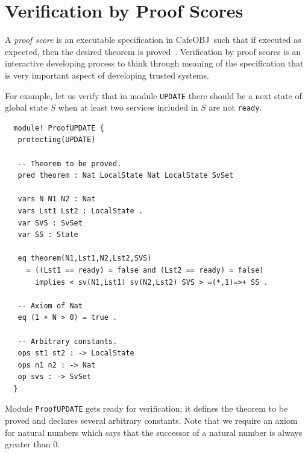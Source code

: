 \documentclass[12pt]{report}
\newcommand{\cafeobj}{{\sf CafeOBJ}~}
\begin{document}
\section{Verification by Proof Scores}
\label{sec:pscore}
A {\it proof score} is an executable specification in \cafeobj such
that if executed as expected, then the desired theorem is
proved~\cite{FutatsugiGO12pps}. Verification by proof scores is an
interactive developing process to think through meaning of the
specification that is very important aspect of developing trusted
systems.

For example, let us verify that in module {\tt UPDATE} there should be
a next state of global state $S$ when at least two services included in $S$
are not {\tt ready}.
\small
\begin{verbatim}
  module! ProofUPDATE {
   protecting(UPDATE)
  
   -- Theorem to be proved.
   pred theorem : Nat LocalState Nat LocalState SvSet
  
   vars N N1 N2 : Nat
   vars Lst1 Lst2 : LocalState .
   var SVS : SvSet
   var SS : State
  
   eq theorem(N1,Lst1,N2,Lst2,SVS)
     = ((Lst1 == ready) = false and (Lst2 == ready) = false)
       implies < sv(N1,Lst1) sv(N2,Lst2) SVS > =(*,1)=>+ SS .
  
   -- Axiom of Nat
   eq (1 + N > 0) = true .
  
   -- Arbitrary constants.
   ops st1 st2 : -> LocalState
   ops n1 n2 : -> Nat
   op svs : -> SvSet
  }
\end{verbatim}
\normalsize
Module {\tt ProofUPDATE} gets ready for verification; it defines the
theorem to be proved and declares several arbitrary constants.  Note
that we require an axiom for natural numbers which says that the
successor of a natural number is always greater than 0.
\end{document}
